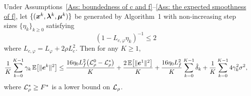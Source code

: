 \documentclass[10pt]{article}
\begin{document}

\begin{lemma}\label{lm: the variance reduction}
Under Assumptions~\ref{Ass: boundedness of c and f}--\ref{Ass: the expected
smoothness of f}, let $\{(\bm{x}^k,\bm{\lambda}^k,\bm{\mu}^k)\}$ be generated by
Algorithm~1 with non-increasing step sizes $\{\eta_k\}_{k\geq 0}$ satisfying
\begin{equation}\label{eq:step-cond}
    (1 - L_{c,\varphi} \eta_k)^{-1} \leq 2
\end{equation} where \(L_{c,\varphi} = L_{\varphi} + 2 \rho L_c^2\). Then for any $K \geq 1$,
\begin{equation}\label{eq:main-bound}
    \frac{1}{K}\sum_{k=0}^{K-1}\gamma_k\,\mathbb{E}\!\left[\|\bm{e}^k\|^2\right]
    \leq
    \frac{16\eta_0 L_f^2\bigl(\mathcal{L}_\rho^0 - \mathcal{L}_\rho^*\bigr)}{K}
    + \frac{2\,\mathbb{E}\!\left[\|\bm{e}^1\|^2\right]}{K}
    + \frac{16\eta_0 L_f^2}{K}\sum_{k=0}^{K-1}\hat{\delta}_k
    + \frac{1}{K}\sum_{k=0}^{K-1}4\gamma_k^2\sigma^2,
\end{equation}
where $\mathcal{L}_\rho^* \geq F^*$ is a lower bound on $\mathcal{L}_\rho$.
\end{lemma}


\end{document}
